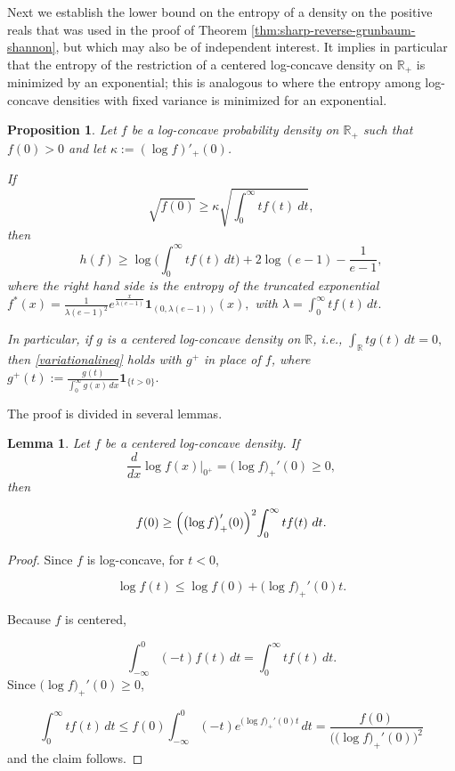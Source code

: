 \documentclass{article}
\theoremstyle{plain}
\newtheorem{lemma}[theorem]{Lemma}
\newtheorem{proposition}[theorem]{Proposition}
\theoremstyle{definition}
\newcommand{\dd}{\,d}
\newcommand{\1}{\mathbf 1}
\begin{document}
Next we establish the lower bound on the entropy of a density on the positive reals that was used in the proof of Theorem \ref{thm:sharp-reverse-grunbaum-shannon}, but which may also be of independent interest. It implies in particular that the entropy of the restriction of a centered log-concave density on $\mathbb R_+$ is minimized by an exponential; this is analogous to \cite{MNR} where the entropy among log-concave densities with fixed variance is minimized for an exponential.
\begin{proposition}
\label{prop:normalized-variational-inequality}
Let \(f\) be a log-concave probability density on \(\mathbb R_+\) such that $f(0)>0$ and let $\kappa:=(\log f)'_+(0)$.

If 
$$
        \sqrt{f(0)}\ge \kappa\sqrt{\int_0^\infty tf(t) \ dt},
$$
then
\begin{equation} \label{variationalineq}
        h(f)\ge \log\Biggl({\int_0^\infty tf(t)\dd t}\Biggr)+2\log(e-1)-\frac1{e-1},
\end{equation}
where the right hand side is the entropy of the truncated exponential $f^*(x) = \frac1{\lambda(e-1)^2}e^{\frac{x}{\lambda (e-1)}}\1_{(0,\lambda (e-1))}(x), $ with $\lambda = \int_0^\infty tf(t)\dd t.$

In particular, if $g$ is a centered log-concave density on \(\mathbb R\), i.e., 
$
\int_{\mathbb R} t g(t)\dd t=0,
$
then \eqref{variationalineq} holds with $g^+$ in place of $f$, where
$
g^+(t):=\frac{g(t)}{\int_0^\infty g(x)\dd x}\1_{\{t>0\}}.
$ 
\end{proposition}

The proof is divided in several lemmas.

\begin{lemma} \label{lemmasatisfiescond}
Let $f$ be a centered log-concave density. If
$$
\frac{d}{dx} \log{f(x)}\Bigg|_{0^+}= \bigl(\log{f}\bigr)_+'(0) \geq 0,
$$
then 

\[
f(0)\ge {\Bigl(\bigl(\log{f}\bigr)_+'(0)\Bigr)^2}{\int_0^\infty tf(t) \ dt}.
\]
\end{lemma}

\begin{proof}


Since \(f\) is log-concave, for \(t<0\),

\[
\log f(t)
\le
\log f(0)+\bigl(\log{f}\bigr)_+'(0)t.
\]


Because \(f\) is centered,

\[
\int_{-\infty}^0 (-t){f(t)}\dd t
=
\int_0^\infty t{f(t)}\dd t
.
\]
Since \(\bigl(\log{f}\bigr)_+'(0) \geq 0\),

\[
\int_0^\infty t{f(t)}\dd t \leq f(0)\int_{-\infty}^0 (-t)e^{\bigl(\log{f}\bigr)_+'(0)t}\dd t
=
\frac{f(0)}{{\bigl(\bigl(\log{f}\bigr)_+'(0)\bigr)^{2}}
}\]
and the claim follows.
\end{proof}
\end{document}
